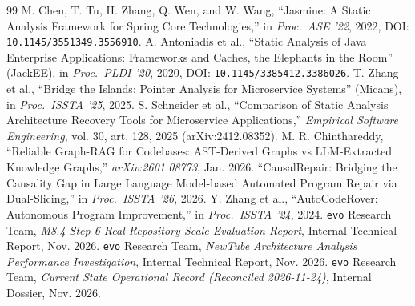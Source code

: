 \documentclass[10pt,a4paper]{article}
\begin{document}
\begin{thebibliography}{99}
 M. Chen, T. Tu, H. Zhang, Q. Wen, and W. Wang, ``Jasmine: A Static Analysis Framework for Spring Core Technologies,'' in \emph{Proc.\ ASE '22}, 2022, DOI: \texttt{10.1145/3551349.3556910}.
 A. Antoniadis et al., ``Static Analysis of Java Enterprise Applications: Frameworks and Caches, the Elephants in the Room'' (JackEE), in \emph{Proc.\ PLDI '20}, 2020, DOI: \texttt{10.1145/3385412.3386026}.
 T. Zhang et al., ``Bridge the Islands: Pointer Analysis for Microservice Systems'' (Micans), in \emph{Proc.\ ISSTA '25}, 2025.
 S. Schneider et al., ``Comparison of Static Analysis Architecture Recovery Tools for Microservice Applications,'' \emph{Empirical Software Engineering}, vol. 30, art. 128, 2025 (arXiv:2412.08352).
 M. R. Chinthareddy, ``Reliable Graph-RAG for Codebases: AST-Derived Graphs vs LLM-Extracted Knowledge Graphs,'' \emph{arXiv:2601.08773}, Jan. 2026.
 ``CausalRepair: Bridging the Causality Gap in Large Language Model-based Automated Program Repair via Dual-Slicing,'' in \emph{Proc.\ ISSTA '26}, 2026.
 Y. Zhang et al., ``AutoCodeRover: Autonomous Program Improvement,'' in \emph{Proc.\ ISSTA '24}, 2024.
 \texttt{evo} Research Team, \emph{M8.4 Step 6 Real Repository Scale Evaluation Report}, Internal Technical Report, Nov. 2026.
 \texttt{evo} Research Team, \emph{NewTube Architecture Analysis Performance Investigation}, Internal Technical Report, Nov. 2026.
 \texttt{evo} Research Team, \emph{Current State Operational Record (Reconciled 2026-11-24)}, Internal Dossier, Nov. 2026.
\end{thebibliography}
\end{document}
